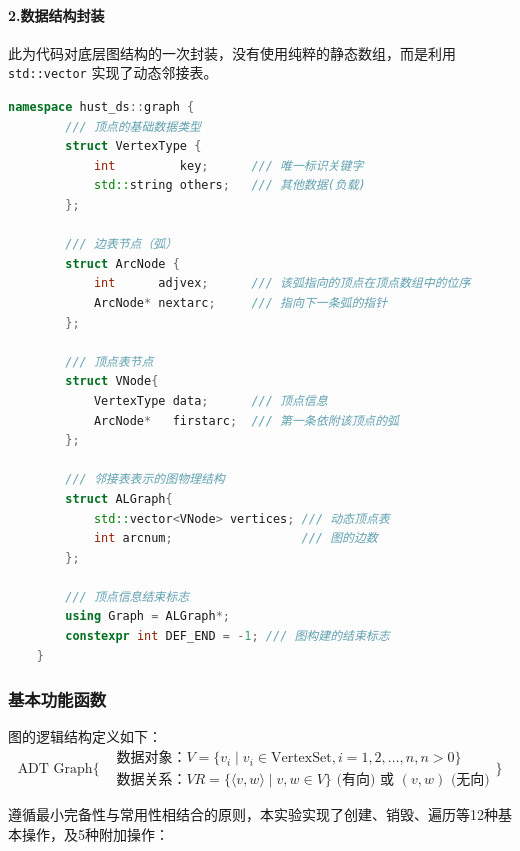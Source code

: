 \documentclass[supercite]{Experimental_Report}
\theoremstyle{definition}
\begin{document}
\paragraph{ 2.数据结构封装 } 
此为代码对底层图结构的一次封装，没有使用纯粹的静态数组，而是利用\texttt{std::vector} 实现了动态邻接表。

\begin{lstlisting}[language=C++]
	namespace hust_ds::graph {
		/// 顶点的基础数据类型
		struct VertexType {
			int         key;      /// 唯一标识关键字
			std::string others;   /// 其他数据(负载)
		};
		
		/// 边表节点（弧）
		struct ArcNode {
			int      adjvex;      /// 该弧指向的顶点在顶点数组中的位序
			ArcNode* nextarc;     /// 指向下一条弧的指针
		};
		
		/// 顶点表节点
		struct VNode{
			VertexType data;      /// 顶点信息
			ArcNode*   firstarc;  /// 第一条依附该顶点的弧
		};
		
		/// 邻接表表示的图物理结构
		struct ALGraph{
			std::vector<VNode> vertices; /// 动态顶点表
			int arcnum;                  /// 图的边数
		};
		
		/// 顶点信息结束标志
		using Graph = ALGraph*;
		constexpr int DEF_END = -1; /// 图构建的结束标志
	}
\end{lstlisting}

\subsubsection{基本功能函数}

图的逻辑结构定义如下：\cite{yan2012data}
\begin{equation*}
	\text{ADT Graph} \{
	\begin{aligned}
		&\text{数据对象：} V = \{v_i \mid v_i \in \text{VertexSet}, i = 1, 2, \dots, n, n > 0\} \\
		&\text{数据关系：} VR = \{\langle v, w \rangle \mid v, w \in V\} \text{ (有向) 或 } (v, w) \text{ (无向)}
	\end{aligned}
	\}
\end{equation*}

遵循最小完备性与常用性相结合的原则，本实验实现了创建、销毁、遍历等12种基本操作，及5种附加操作：
\end{document}
